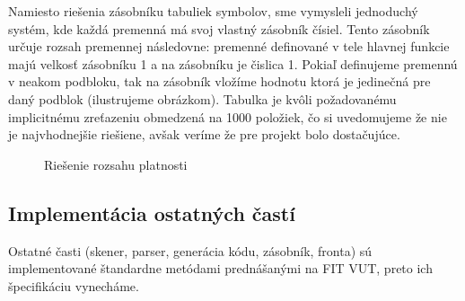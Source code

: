 \documentclass[Slovak, a4paper, 12pt]{article}
\begin{document}
	 Namiesto riešenia zásobníku tabuliek symbolov, sme vymysleli jednoduchý systém, kde každá premenná má svoj vlastný zásobník čísiel. Tento zásobník určuje 
	 rozsah premennej následovne: premenné definované v tele hlavnej funkcie majú velkosť zásobníku 1 a na zásobníku je čislica 1. Pokiaľ definujeme premennú v neakom podbloku, tak na zásobník vložíme hodnotu ktorá je jedinečná pre daný podblok (ilustrujeme obrázkom). Tabulka je kvôli požadovanému implicitnému
	 zreťazeniu obmedzená na 1000 položiek, čo si uvedomujeme že nie je najvhodnejšie riešiene, avšak veríme že pre projekt bolo dostačujúce. 
	 \\
	\begin{figure}[ht]
		\begin{center}
			\caption{Riešenie rozsahu platnosti}
		\end{center}
	\end{figure}
	\newpage

	\subsection{Implementácia ostatných častí}
	Ostatné časti (skener, parser, generácia kódu, zásobník, fronta) sú implementované štandardne metódami prednášanými na FIT VUT, preto ich špecifikáciu
	vynecháme.  
	
\end{document}

